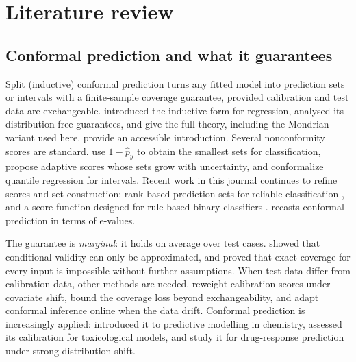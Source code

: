 \section{Literature review}\label{sec:literature}

\subsection{Conformal prediction and what it guarantees}
Split (inductive) conformal prediction turns any fitted model into prediction sets or intervals with a finite-sample coverage guarantee, provided calibration and test data are exchangeable. \citet{papadopoulos2002} introduced the inductive form for regression, \citet{lei2018} analysed its distribution-free guarantees, and \citet{vovk2022} give the full theory, including the Mondrian variant used here. \citet{angelopoulos2023} provide an accessible introduction. Several nonconformity scores are standard. \citet{sadinle2019} use $1-\hat p_y$ to obtain the smallest sets for classification, \citet{romano2020a} propose adaptive scores whose sets grow with uncertainty, and \citet{romano2019} conformalize quantile regression for intervals. Recent work in this journal continues to refine scores and set construction: rank-based prediction sets for reliable classification \citep{luo2026rank}, and a score function designed for rule-based binary classifiers \citep{narteni2026}. \citet{vovk2025e} recasts conformal prediction in terms of e-values.

The guarantee is \emph{marginal}: it holds on average over test cases. \citet{vovk2012} showed that conditional validity can only be approximated, and \citet{foygelbarber2021} proved that exact coverage for every input is impossible without further assumptions. When test data differ from calibration data, other methods are needed. \citet{tibshirani2019} reweight calibration scores under covariate shift, \citet{barber2023} bound the coverage loss beyond exchangeability, and \citet{hallberg2026} adapt conformal inference online when the data drift. Conformal prediction is increasingly applied: \citet{norinder2014} introduced it to predictive modelling in chemistry, \citet{morger2021} assessed its calibration for toxicological models, and \citet{hernandez2026} study it for drug-response prediction under strong distribution shift.

